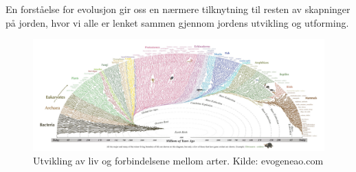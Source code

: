 \documentclass[main.tex]{subfiles}
\begin{document}
\newline\newline
En forståelse for evolusjon gir oss en nærmere tilknytning til resten av skapninger på jorden, hvor vi alle er lenket sammen gjennom jordens utvikling og utforming.
\begin{figure}
    \centering
    \includegraphics[scale = 0.37]{../figures/utviklingavliv.jpg}
    \caption{Utvikling av liv og forbindelsene mellom arter. Kilde: evogeneao.com}
\end{figure}
\end{document}
